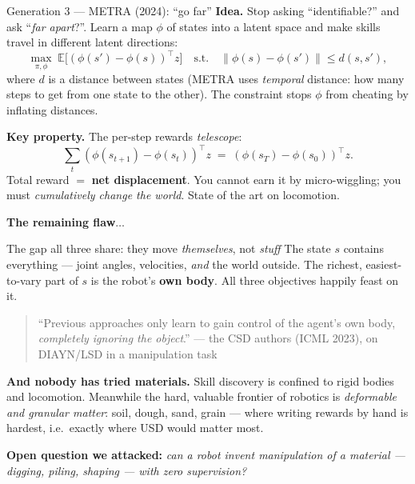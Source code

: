 \documentclass[aspectratio=169,11pt]{beamer}
\begin{document}
\begin{frame}{Generation 3 --- METRA (2024): ``go far''}
\textbf{Idea.} Stop asking ``identifiable?'' and ask ``\emph{far apart}?''. Learn a map $\phi$ of states into a latent space and make skills travel in different latent directions:
\[
\max_{\pi,\phi}\; \mathbb{E}\big[(\phi(s') - \phi(s))^{\!\top} z\big]
\quad \text{s.t.} \quad \|\phi(s) - \phi(s')\| \le d(s, s'),
\]
where $d$ is a distance between states (METRA uses \emph{temporal} distance: how many steps to get from one state to the other). The constraint stops $\phi$ from cheating by inflating distances.

\medskip
\textbf{Key property.} The per-step rewards \emph{telescope}:
\[
\textstyle\sum_t (\phi(s_{t+1})-\phi(s_t))^{\top} z \;=\; (\phi(s_T) - \phi(s_0))^{\top} z .
\]
Total reward $=$ \textbf{net displacement}. You cannot earn it by micro-wiggling; you must \emph{cumulatively change the world}. State of the art on locomotion.

\medskip
\textbf{The remaining flaw$\ldots$}
\end{frame}

\begin{frame}{The gap all three share: they move \emph{themselves}, not \emph{stuff}}
The state $s$ contains everything --- joint angles, velocities, \emph{and} the world outside. The richest, easiest-to-vary part of $s$ is the robot's \textbf{own body}. All three objectives happily feast on it.

\begin{quote}
``Previous approaches only learn to gain control of the agent's own body, \emph{completely ignoring the object}.'' --- the CSD authors (ICML 2023), on DIAYN/LSD in a manipulation task
\end{quote}

\textbf{And nobody has tried materials.} Skill discovery is confined to rigid bodies and locomotion. Meanwhile the hard, valuable frontier of robotics is \emph{deformable and granular matter}: soil, dough, sand, grain --- where writing rewards by hand is hardest, i.e.\ exactly where USD would matter most.

\bigskip
\begin{center}
\textbf{Open question we attacked:} \emph{can a robot invent manipulation of a material --- digging, piling, shaping --- with zero supervision?}
\end{center}
\end{frame}

\end{document}
